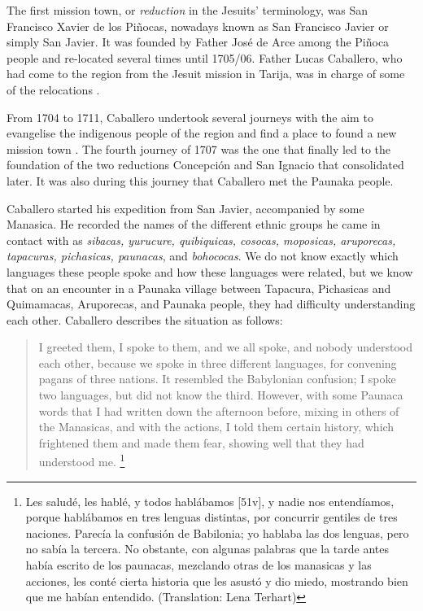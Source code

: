 The first mission town, or \textit{reduction} in the Jesuits’ terminology, was San Francisco Xavier de los Piñocas, nowadays known as San Francisco Javier or simply San Javier. It was founded by Father José de Arce among the Piñoca people and re-located several times until 1705/06. Father Lucas Caballero, who had come to the region from the Jesuit mission in Tarija, was in charge of some of the relocations \citep[529--531]{TomichaCharupa2002}.

From 1704 to 1711, Caballero undertook several journeys with the aim to evangelise the indigenous people of the region and find a place to found a new mission town \citep[536]{TomichaCharupa2002}. The fourth journey of 1707 was the one that finally led to the foundation of the two reductions Concepción and San Ignacio that consolidated later. It was also during this journey that Caballero met the Paunaka people. 

Caballero started his expedition from San Javier, accompanied by some Ma\-na\-si\-ca. He recorded the names of the different ethnic groups he came in contact with as \textit{sibacas, yurucure, quibiquicas, cosocas, moposicas, aruporecas, tapacuras, pichasicas, paunacas}, and \textit{bohococas}. We do not know exactly which languages these people spoke and how these languages were related, but we know that on an encounter in a Paunaka village between Tapacura, Pichasicas and Quimamacas, Aruporecas, and Paunaka people, they had difficulty understanding each other. Caballero describes the situation as follows:

\begin{quotation}
I greeted them, I spoke to them, and we all spoke, and nobody understood each other, because we spoke in three different languages, for convening pagans of three nations. It resembled the Babylonian confusion; I spoke two languages, but did not know the third. However, with some Paunaca words that I had written down the afternoon before, mixing in others of the Manasicas, and with the actions, I told them certain history, which frightened them and made them fear, showing well that they had understood me. \citep[85]{Matienzo_et_al2011}\footnote{Les saludé, les hablé, y todos hablábamos [51v], y nadie nos entendíamos, porque hablábamos en tres lenguas distintas, por concurrir gentiles de tres naciones. Parecía la confusión de Babilonia; yo hablaba las dos lenguas, pero no sabía la tercera. No obstante, con algunas palabras que la tarde antes había escrito de los paunacas, mezclando otras de los manasicas y las acciones, les conté cierta historia que les asustó y dio miedo, mostrando bien que me habían entendido.
(Translation: Lena Terhart)}\end{quotation}

